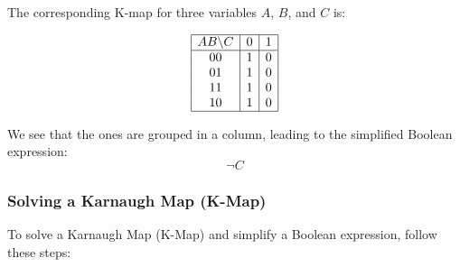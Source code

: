 The corresponding K-map for three variables \( A \), \( B \), and \( C \) is:

\[
\begin{array}{|c|c|c|c|}
\hline
AB \backslash C & 0 & 1 \\
\hline
00 & 1 & 0 \\
01 & 1 & 0 \\
11 & 1 & 0 \\
10 & 1 & 0 \\
\hline
\end{array}
\]

We see that the ones are grouped in a column, leading to the simplified Boolean expression:
\[
\neg C
\]

\subsubsection{Solving a Karnaugh Map (K-Map)}

To solve a Karnaugh Map (K-Map) and simplify a Boolean expression, follow these steps:

